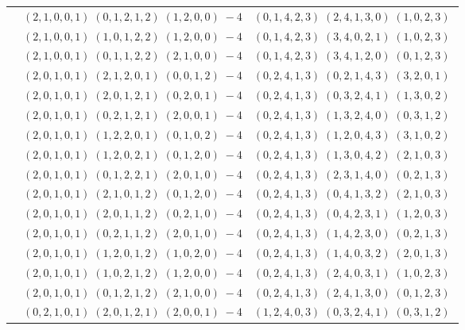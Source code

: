 \documentclass[11pt]{article}
\begin{document}
\begin{longtable}[l]{|c|c|c|}
 \cline{2-3} 
 & $(2 ,1 ,0 ,0 ,1) \;(0 ,1 ,2 ,1 ,2) \;(1 ,2 ,0 ,0) \;-4$ & $(0 ,1 ,4 ,2 ,3) \;(2 ,4 ,1 ,3 ,0) \;(1 ,0 ,2 ,3) \;$\\ 
 \cline{2-3} 
 & $(2 ,1 ,0 ,0 ,1) \;(1 ,0 ,1 ,2 ,2) \;(1 ,2 ,0 ,0) \;-4$ & $(0 ,1 ,4 ,2 ,3) \;(3 ,4 ,0 ,2 ,1) \;(1 ,0 ,2 ,3) \;$\\ 
 \cline{2-3} 
 & $(2 ,1 ,0 ,0 ,1) \;(0 ,1 ,1 ,2 ,2) \;(2 ,1 ,0 ,0) \;-4$ & $(0 ,1 ,4 ,2 ,3) \;(3 ,4 ,1 ,2 ,0) \;(0 ,1 ,2 ,3) \;$\\ 
 \cline{2-3} 
 & $(2 ,0 ,1 ,0 ,1) \;(2 ,1 ,2 ,0 ,1) \;(0 ,0 ,1 ,2) \;-4$ & $(0 ,2 ,4 ,1 ,3) \;(0 ,2 ,1 ,4 ,3) \;(3 ,2 ,0 ,1) \;$\\ 
 \cline{2-3} 
 & $(2 ,0 ,1 ,0 ,1) \;(2 ,0 ,1 ,2 ,1) \;(0 ,2 ,0 ,1) \;-4$ & $(0 ,2 ,4 ,1 ,3) \;(0 ,3 ,2 ,4 ,1) \;(1 ,3 ,0 ,2) \;$\\ 
 \cline{2-3} 
 & $(2 ,0 ,1 ,0 ,1) \;(0 ,2 ,1 ,2 ,1) \;(2 ,0 ,0 ,1) \;-4$ & $(0 ,2 ,4 ,1 ,3) \;(1 ,3 ,2 ,4 ,0) \;(0 ,3 ,1 ,2) \;$\\ 
 \cline{2-3} 
 & $(2 ,0 ,1 ,0 ,1) \;(1 ,2 ,2 ,0 ,1) \;(0 ,1 ,0 ,2) \;-4$ & $(0 ,2 ,4 ,1 ,3) \;(1 ,2 ,0 ,4 ,3) \;(3 ,1 ,0 ,2) \;$\\ 
 \cline{2-3} 
 & $(2 ,0 ,1 ,0 ,1) \;(1 ,2 ,0 ,2 ,1) \;(0 ,1 ,2 ,0) \;-4$ & $(0 ,2 ,4 ,1 ,3) \;(1 ,3 ,0 ,4 ,2) \;(2 ,1 ,0 ,3) \;$\\ 
 \cline{2-3} 
 & $(2 ,0 ,1 ,0 ,1) \;(0 ,1 ,2 ,2 ,1) \;(2 ,0 ,1 ,0) \;-4$ & $(0 ,2 ,4 ,1 ,3) \;(2 ,3 ,1 ,4 ,0) \;(0 ,2 ,1 ,3) \;$\\ 
 \cline{2-3} 
 & $(2 ,0 ,1 ,0 ,1) \;(2 ,1 ,0 ,1 ,2) \;(0 ,1 ,2 ,0) \;-4$ & $(0 ,2 ,4 ,1 ,3) \;(0 ,4 ,1 ,3 ,2) \;(2 ,1 ,0 ,3) \;$\\ 
 \cline{2-3} 
 & $(2 ,0 ,1 ,0 ,1) \;(2 ,0 ,1 ,1 ,2) \;(0 ,2 ,1 ,0) \;-4$ & $(0 ,2 ,4 ,1 ,3) \;(0 ,4 ,2 ,3 ,1) \;(1 ,2 ,0 ,3) \;$\\ 
 \cline{2-3} 
 & $(2 ,0 ,1 ,0 ,1) \;(0 ,2 ,1 ,1 ,2) \;(2 ,0 ,1 ,0) \;-4$ & $(0 ,2 ,4 ,1 ,3) \;(1 ,4 ,2 ,3 ,0) \;(0 ,2 ,1 ,3) \;$\\ 
 \cline{2-3} 
 & $(2 ,0 ,1 ,0 ,1) \;(1 ,2 ,0 ,1 ,2) \;(1 ,0 ,2 ,0) \;-4$ & $(0 ,2 ,4 ,1 ,3) \;(1 ,4 ,0 ,3 ,2) \;(2 ,0 ,1 ,3) \;$\\ 
 \cline{2-3} 
 & $(2 ,0 ,1 ,0 ,1) \;(1 ,0 ,2 ,1 ,2) \;(1 ,2 ,0 ,0) \;-4$ & $(0 ,2 ,4 ,1 ,3) \;(2 ,4 ,0 ,3 ,1) \;(1 ,0 ,2 ,3) \;$\\ 
 \cline{2-3} 
 & $(2 ,0 ,1 ,0 ,1) \;(0 ,1 ,2 ,1 ,2) \;(2 ,1 ,0 ,0) \;-4$ & $(0 ,2 ,4 ,1 ,3) \;(2 ,4 ,1 ,3 ,0) \;(0 ,1 ,2 ,3) \;$\\ 
 \cline{2-3} 
 & $(0 ,2 ,1 ,0 ,1) \;(2 ,0 ,1 ,2 ,1) \;(2 ,0 ,0 ,1) \;-4$ & $(1 ,2 ,4 ,0 ,3) \;(0 ,3 ,2 ,4 ,1) \;(0 ,3 ,1 ,2) \;$\\ 

\end{longtable}
\end{document}

